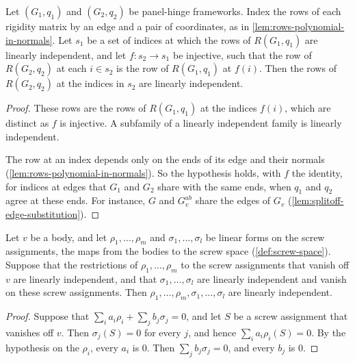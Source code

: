 \begin{lemma}
  \label{lem:case-II-placement-old-rows}
  \leanok
  Let $(G_1, q_1)$ and $(G_2, q_2)$ be panel-hinge frameworks. Index the
  rows of each rigidity matrix by an edge and a pair of coordinates, as
  in \cref{lem:rows-polynomial-in-normals}. Let $s_1$ be a set of indices at
  which the rows of $R(G_1, q_1)$ are linearly independent, and let
  $f \colon s_2 \to s_1$ be injective, such that the row of
  $R(G_2, q_2)$ at each $i \in s_2$ is the row of $R(G_1, q_1)$ at
  $f(i)$. Then the rows of $R(G_2, q_2)$ at the indices in $s_2$ are
  linearly independent.
\end{lemma}
\begin{proof}
  \leanok
  These rows are the rows of $R(G_1, q_1)$ at the indices $f(i)$, which
  are distinct as $f$ is injective. A subfamily of a linearly independent
  family is linearly independent.

  The row at an index depends only on the ends of its edge and their
  normals (\cref{lem:rows-polynomial-in-normals}). So the hypothesis holds,
  with $f$ the identity, for indices at edges that $G_1$ and $G_2$ share
  with the same ends, when $q_1$ and $q_2$ agree at these ends. For
  instance, $G$ and $G_v^{ab}$ share the edges of $G_v$
  (\cref{lem:splitoff-edge-substitution}).
\end{proof}

\begin{lemma}
  \label{lem:case-II-placement-block-independent}
  \leanok
  Let $v$ be a body, and let $\rho_1, \dots, \rho_m$ and
  $\sigma_1, \dots, \sigma_l$ be linear forms on the screw assignments,
  the maps from the bodies to the screw space (\cref{def:screw-space}).
  Suppose that the restrictions of $\rho_1, \dots, \rho_m$ to the screw
  assignments that vanish off $v$ are linearly independent, and that
  $\sigma_1, \dots, \sigma_l$ are linearly independent and vanish on
  these screw assignments. Then
  $\rho_1, \dots, \rho_m, \sigma_1, \dots, \sigma_l$ are linearly
  independent.
\end{lemma}
\begin{proof}
  \leanok
  Suppose that $\sum_i a_i \rho_i + \sum_j b_j \sigma_j = 0$, and let $S$
  be a screw assignment that vanishes off $v$. Then $\sigma_j(S) = 0$ for
  every $j$, and hence $\sum_i a_i \rho_i(S) = 0$. By the hypothesis on
  the $\rho_i$, every $a_i$ is $0$. Then $\sum_j b_j \sigma_j = 0$, and
  every $b_j$ is $0$.
\end{proof}

